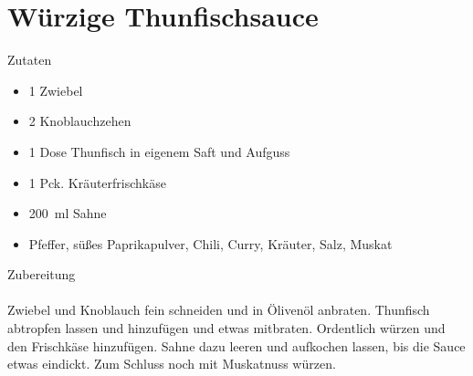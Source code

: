 
\section*{Würzige Thunfischsauce}
\ihead{}\ohead{}
\cfoot{}
{\Large Zutaten}
\begin{multicols}{2}
\begin{itemize}
    \item \num{1} Zwiebel
    \item \num{2} Knoblauchzehen
    \item \num{1} Dose Thunfisch in eigenem Saft und Aufguss
    \item \num{1} Pck. Kräuterfrischkäse
    \item \SI{200}{ml} Sahne
    \item Pfeffer, süßes Paprikapulver, Chili, Curry, Kräuter, Salz, Muskat
\end{itemize}
\columnbreak
\end{multicols}
\noindent
{\Large Zubereitung}\\
\\
Zwiebel und Knoblauch fein schneiden und in Ölivenöl anbraten. 
Thunfisch abtropfen lassen und hinzufügen und etwas mitbraten.
Ordentlich würzen und den Frischkäse hinzufügen.
Sahne dazu leeren und aufkochen lassen, bis die Sauce etwas eindickt.
Zum Schluss noch mit Muskatnuss würzen.
